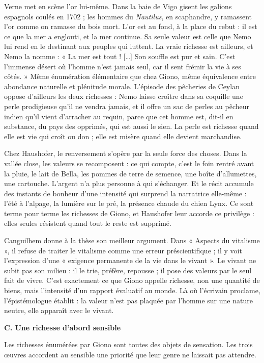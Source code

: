 \documentclass[11pt,a4paper]{article}
\begin{document}
Verne met en scène l'or lui-même. Dans la baie de Vigo gisent les galions espagnols coulés en 1702 ; les hommes du \emph{Nautilus}, en scaphandre, y ramassent l'or comme on ramasse du bois mort. L'or est au fond, à la place du rebut : il est ce que la mer a englouti, et la mer continue. Sa seule valeur est celle que Nemo lui rend en le destinant aux peuples qui luttent. La vraie richesse est ailleurs, et Nemo la nomme : « La mer est tout ! {[}\ldots{]} Son souffle est pur et sain. C'est l'immense désert où l'homme n'est jamais seul, car il sent frémir la vie à ses côtés. » Même énumération élémentaire que chez Giono, même équivalence entre abondance naturelle et plénitude morale. L'épisode des pêcheries de Ceylan oppose d'ailleurs les deux richesses : Nemo laisse croître dans sa coquille une perle prodigieuse qu'il ne vendra jamais, et il offre un sac de perles au pêcheur indien qu'il vient d'arracher au requin, parce que cet homme est, dit-il en substance, du pays des opprimés, qui est aussi le sien. La perle est richesse quand elle est vie qui croît ou don ; elle est misère quand elle devient marchandise.

Chez Haushofer, le renversement s'opère par la seule force des choses. Dans la vallée close, les valeurs se recomposent : ce qui compte, c'est le foin rentré avant la pluie, le lait de Bella, les pommes de terre de semence, une boîte d'allumettes, une cartouche. L'argent n'a plus personne à qui s'échanger. Et le récit accumule des instants de bonheur d'une intensité qui surprend la narratrice elle-même : l'été à l'alpage, la lumière sur le pré, la présence chaude du chien Lynx. Ce sont terme pour terme les richesses de Giono, et Haushofer leur accorde ce privilège : elles seules résistent quand tout le reste est supprimé.

Canguilhem donne à la thèse son meilleur argument. Dans « Aspects du vitalisme », il refuse de traiter le vitalisme comme une erreur préscientifique ; il y voit l'expression d'une « exigence permanente de la vie dans le vivant ». Le vivant ne subit pas son milieu : il le trie, préfère, repousse ; il pose des valeurs par le seul fait de vivre. C'est exactement ce que Giono appelle richesse, non une quantité de biens, mais l'intensité d'un rapport évaluatif au monde. Là où l'écrivain proclame, l'épistémologue établit : la valeur n'est pas plaquée par l'homme sur une nature neutre, elle apparaît avec le vivant.

\textbf{C. Une richesse d'abord sensible}

Les richesses énumérées par Giono sont toutes des objets de sensation. Les trois œuvres accordent au sensible une priorité que leur genre ne laissait pas attendre.
\end{document}
